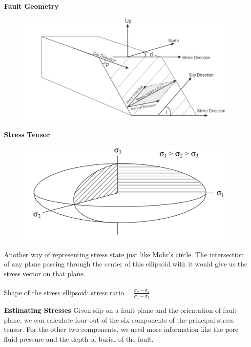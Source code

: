 \documentclass[11pt]{beamer}
\begin{document}
\begin{frame}{\textbf{Fault Geometry}}
    \begin{figure}
        \includegraphics[width=1\linewidth]{images/fault}
    \end{figure}
\end{frame}


\begin{frame}{\textbf{Stress Tensor}}
    \begin{figure}
        \includegraphics[width=0.7\linewidth]{images/stressellipse}
    \end{figure}
    Another way of representing stress state just like Mohr's circle. The intersection of any plane passing through the center of this ellipsoid with it would give us the stress vector on that plane.
    \\~\\
    Shape of the stress ellipsoid: stress ratio = $\frac{\sigma_2 - \sigma_3}{\sigma_1 - \sigma_3}$
\end{frame}

\begin{frame}{\textbf{Estimating Stresses}}
    Given slip on a fault plane and the orientation of fault plane, we can calculate four out of the six components of the principal stress tensor. For the other two components, we need more information like the pore fluid pressure and the depth of burial of the fault.
\end{frame}
\end{document}
